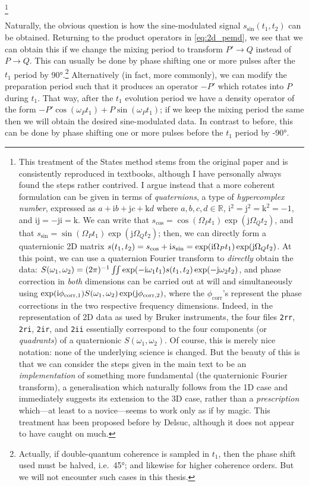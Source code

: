 \footnote{This treatment of the States method stems from the original paper\autocite{States1982JMR} and is consistently reproduced in textbooks, although I have personally always found the steps rather contrived.
    I argue instead that a more coherent formulation can be given in terms of \textit{quaternions}, a type of \textit{hypercomplex number}, expressed as $a + \mathrm{i}b + \mathrm{j}c + \mathrm{k}d$ where $a, b, c, d \in \mathbb{R}$, $\mathrm{i}^2 = \mathrm{j}^2 = \mathrm{k}^2 = -1$, and $\mathrm{ij = -ji = k}$.
    We can write that $s_\text{cos} = \cos(\Omega_P t_1)\exp(\mathrm{j}\Omega_Q t_2)$, and that $s_\text{sin} = \sin(\Omega_P t_1)\exp(\mathrm{j}\Omega_Q t_2)$; then, we can directly form a quaternionic 2D matrix $s(t_1, t_2) = s_\text{cos} + \mathrm{i} s_\text{sin} = \exp(\mathrm{i}\Omega_P t_1)\exp(\mathrm{j}\Omega_Q t_2)$.
    At this point, we can use a quaternion Fourier transform to \textit{directly} obtain the data: $S(\omega_1, \omega_2) = (2\pi)^{-1}\iint \exp(-\mathrm{i}\omega_1 t_1)s(t_1, t_2) \exp(-\mathrm{j}\omega_2 t_2)$, and phase correction in \textit{both} dimensions can be carried out at will and simultaneously using
    $\exp(\mathrm{i} \phi_\text{corr,1})S(\omega_1, \omega_2) \exp(\mathrm{j}\phi_\text{corr,2})$, where the $\phi_\text{corr}$'s represent the phase corrections in the two respective frequency dimensions.
    Indeed, in the representation of 2D data as used by Bruker instruments, the four files \texttt{2rr}, \texttt{2ri}, \texttt{2ir}, and \texttt{2ii} essentially correspond to the four components (or \textit{quadrants}) of a quaternionic $S(\omega_1, \omega_2)$.
    Of course, this is merely nice notation: none of the underlying science is changed.
    But the beauty of this is that we can consider the steps given in the main text to be an \textit{implementation} of something more fundamental (the quaternionic Fourier transform), a generalisation which naturally follows from the 1D case and immediately suggests its extension to the 3D case, rather than a \textit{prescription} which---at least to a novice---seems to work only as if by magic.
    This treatment has been proposed before by Delsuc\autocite{Delsuc1988JMR}, although it does not appear to have caught on much.
}

Naturally, the obvious question is how the sine-modulated signal $s_\text{sin}(t_1, t_2)$ can be obtained.
Returning to the product operators in \cref{eq:2d_pemd}, we see that we can obtain this if we change the mixing period to transform $P' \to Q$ instead of $P \to Q$.
This can usually be done by phase shifting one or more pulses after the $t_1$ period by \ang{90}.\footnote{Actually, if double-quantum coherence is sampled in $t_1$, then the phase shift used must be halved, i.e.\ \ang{45}; and likewise for higher coherence orders. But we will not encounter such cases in this thesis.}
Alternatively (in fact, more commonly), we can modify the preparation period such that it produces an operator $-P'$ which rotates into $P$ during $t_1$.
That way, after the $t_1$ evolution period we have a density operator of the form $-P'\cos(\omega_P t_1) + P\sin(\omega_P t_1)$; if we keep the mixing period the same then we will obtain the desired sine-modulated data.
In contrast to before, this can be done by phase shifting one or more pulses before the $t_1$ period by \ang{-90}.

